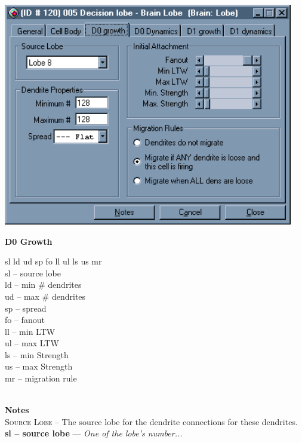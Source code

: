 \documentclass[11pt,twoside,a4paper]{article}
\begin{document}
\begin{minipage}[ht]{0.40\textwidth}
	\includegraphics[width=0.95\textwidth]{img/gen00k3.png}
\end{minipage} \hfill \begin{minipage}[ht]{0.575\textwidth}
	\textbf{\large D0 Growth} %

	sl ld ud sp fo ll ul ls us mr ~\\

	sl -- source lobe ~\\
	ld -- min \# dendrites ~\\
	ud -- max \# dendrites ~\\
	sp -- spread ~\\
	fo -- fanout ~\\
	ll -- min LTW ~\\
	ul -- max LTW ~\\
	ls -- min Strength ~\\
	us -- max Strength ~\\
	mr -- migration rule ~\\
\end{minipage} ~\\

\textbf{\large Notes} ~\\

\textsc{Source Lobe} -- The source lobe for the dendrite connections for these dendrites. ~\\

\textbf{sl -- source lobe} --- \emph{One of the lobe's number...} ~\\
\end{document}
